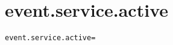 \section{event.service.active}
\label{configuration:EventServiceActive}
\AvailableInCsharpOnly{\TODO}
\begin{lstlisting}[style=Props,caption={Usage example for \textit{event.service.active}}]
event.service.active=
\end{lstlisting}